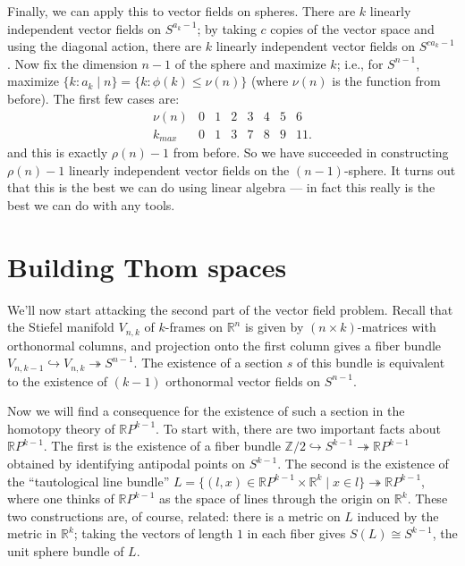 \documentclass{article}
\newcommand{\OutputBuildingThomSpaces}{}
\newcommand{\Z}{\mathbb{Z}}
\newcommand{\R}{\mathbb{R}}
\newcommand{\RP}{\R P}
\newcommand{\into}{\hookrightarrow}
\newcommand{\onto}{\twoheadrightarrow}
\begin{document}
Finally, we can apply this to vector fields on spheres.  There are $k$ linearly independent vector fields on $S^{a_k - 1}$; by taking $c$ copies of the vector space and using the diagonal action, there are $k$ linearly independent vector fields on $S^{ca_k - 1}$.  Now fix the dimension $n-1$ of the sphere and maximize $k$; i.e., for $S^{n-1}$, maximize $\{k : a_k \mid n\} = \{ k : \phi(k) \le \nu(n)\}$ (where $\nu(n)$ is the function from before).  The first few cases are:
\[\begin{array}{c|ccccccc}
\nu(n) & 0 & 1 & 2 & 3 & 4 & 5 & 6 \\
\hline
k_{max} & 0 & 1 & 3 & 7 & 8 & 9 & 11.
\end{array}\]
and this is exactly $\rho(n) - 1$ from before.  So we have succeeded in constructing $\rho(n) - 1$ linearly independent vector fields on the $(n-1)$-sphere.  It turns out that this is the best we can do using linear algebra --- in fact this really is the best we can do with any tools.

\fi
\section{Building Thom spaces} %
\ifx\OutputBuildingThomSpaces\undefined\else
We'll now start attacking the second part of the vector field problem.  Recall that the Stiefel manifold $V_{n, k}$ of $k$-frames on $\R^n$ is given by $(n \times k)$-matrices with orthonormal columns, and projection onto the first column gives a fiber bundle $V_{n, k-1} \into V_{n, k} \onto S^{n-1}$.  The existence of a section $s$ of this bundle is equivalent to the existence of $(k-1)$ orthonormal vector fields on $S^{n-1}$.

Now we will find a consequence for the existence of such a section in the homotopy theory of $\RP^{k-1}$.  To start with, there are two important facts about $\RP^{k-1}$.  The first is the existence of a fiber bundle $\Z/2 \into S^{k-1} \onto \RP^{k-1}$ obtained by identifying antipodal points on $S^{k-1}$.  The second is the existence of the ``tautological line bundle'' $L = \{(l, x) \in \RP^{k-1} \times \R^k \mid x \in l\} \onto \RP^{k-1}$, where one thinks of $\RP^{k-1}$ as the space of lines through the origin on $\R^k$.  These two constructions are, of course, related: there is a metric on $L$ induced by the metric in $\R^k$; taking the vectors of length $1$ in each fiber gives $S(L) \cong S^{k-1}$, the unit sphere bundle of $L$.
\end{document}

